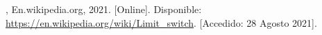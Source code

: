 



\begin{flushleft}
\begin{thebibliography}{9}

, En.wikipedia.org, 2021. [Online]. Disponible: \href{https://en.wikipedia.org/wiki/Limit\_switch}{https://en.wikipedia.org/wiki/Limit\_switch}. [Accedido: 28 Agosto 2021].

\end{thebibliography}
\end{flushleft}


